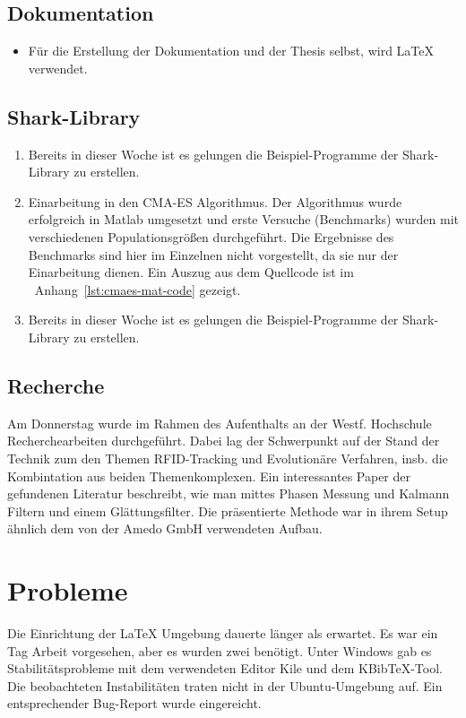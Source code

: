 \documentclass[a4paper,12pt,fleqn]{scrartcl}
\begin{document}
\subsection{Dokumentation}
\begin{itemize}
  \item Für die Erstellung der Dokumentation und der Thesis selbst, wird
      \LaTeX{} verwendet.

\end{itemize}

\subsection{Shark-Library}
\begin{enumerate}
 \item Bereits in dieser Woche ist es gelungen die Beispiel-Programme der Shark-Library
      zu erstellen.
 \item Einarbeitung in den CMA-ES Algorithmus. Der Algorithmus wurde erfolgreich
      in Matlab umgesetzt und erste Versuche (Benchmarks) wurden mit verschiedenen Populationsgrößen durchgeführt.
      Die Ergebnisse des Benchmarks sind hier im Einzelnen nicht vorgestellt, da sie nur der Einarbeitung dienen.
      Ein Auszug aus dem Quellcode ist im \ Anhang~\ref{lst:cmaes-mat-code} gezeigt.
 \item Bereits in dieser Woche ist es gelungen die Beispiel-Programme der Shark-Library zu erstellen.

\end{enumerate}

\subsection{Recherche}
Am Donnerstag wurde im Rahmen des Aufenthalts an der Westf. Hochschule Recherchearbeiten durchgeführt. Dabei lag der
Schwerpunkt auf der Stand der Technik zum den Themen RFID-Tracking und Evolutionäre Verfahren, insb. die Kombintation aus beiden Themenkomplexen.
Ein interessantes Paper \cite{KALMANandSMOOTHING} der gefundenen Literatur beschreibt, wie man mittes Phasen Messung und Kalmann Filtern \cite{Wiki:1} und einem
Glättungsfilter. Die präsentierte Methode war in ihrem Setup ähnlich dem von der Amedo GmbH verwendeten Aufbau.

\section[Probleme]{Probleme}
Die Einrichtung der \LaTeX{} Umgebung dauerte länger als erwartet. Es war ein
Tag Arbeit vorgesehen, aber es wurden zwei benötigt.
Unter Windows gab es Stabilitätsprobleme mit dem verwendeten Editor Kile und dem KBibTeX-Tool.
Die beobachteten Instabilitäten traten nicht in der Ubuntu-Umgebung auf. Ein entsprechender Bug-Report wurde eingereicht.
\end{document}
